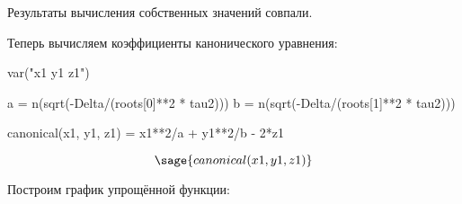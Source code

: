 \documentclass{article}
\begin{document}
Результаты вычисления собственных значений совпали.

Теперь вычисляем коэффициенты канонического уравнения:

\begin{sagesilent}
var("x1 y1 z1")
\end{sagesilent}

\begin{sageblock}
a = n(sqrt(-Delta/(roots[0]**2 * tau2)))
b = n(sqrt(-Delta/(roots[1]**2 * tau2)))
\end{sageblock}

\begin{sageblock}
canonical(x1, y1, z1) = x1**2/a + y1**2/b - 2*z1
\end{sageblock}

$$\sage{canonical(x1, y1, z1)}$$

Построим график упрощённой функции:

\begin{center}
\end{center}
\end{document}
